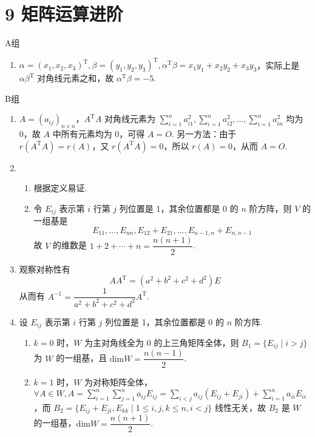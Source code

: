 \section*{9 矩阵运算进阶}

\vspace{2ex}

\centerline{\heiti A组}
\begin{enumerate}
    \item $\alpha = (x_1,x_2,x_3)^{\mathrm{T}},\beta = (y_1,y_2,y_3)^{\mathrm{T}},\alpha^{\mathrm{T}}\beta=x_1y_1+x_2y_2+x_3y_3$，实际上是 $\alpha\beta^{\mathrm{T}}$ 对角线元素之和，故 $\alpha^{\mathrm{T}}\beta=-5$.
\end{enumerate}

\centerline{\heiti B组}
\begin{enumerate}
    \item $A=(a_{ij})_{n\times n}$，$A^\mathrm{T}A$ 对角线元素为 $\displaystyle\sum_{i=1}^na_{i1}^2,\sum_{i=1}^na_{i2}^2,\ldots,\sum_{i=1}^na_{in}^2$ 均为 0，故 $A$ 中所有元素均为 0，可得 $A=O$. 另一方法：由于 $r(A^\mathrm{T}A) = r(A)$，又 $r(A^\mathrm{T}A)=0$，所以 $r(A)=0$，从而 $A=O$.

    \item \begin{enumerate}
              \item 根据定义易证.

              \item 令 $E_{ij}$ 表示第 $i$ 行第 $j$ 列位置是 1，其余位置都是 0 的 $n$ 阶方阵，则 $V$ 的一组基是
                    \[E_{11},\ldots,E_{nn},E_{12}+E_{21},\ldots,E_{n-1,n}+E_{n,n-1}\]
                    故 $V$ 的维数是 $1+2+\cdots+n=\dfrac{n(n+1)}{2}$.
          \end{enumerate}

    \item 观察对称性有
          \[AA^{\mathrm{T}}=(a^2+b^2+c^2+d^2)E\]
          从而有 $A^{-1}=\dfrac{1}{a^2+b^2+c^2+d^2}A^{\mathrm{T}}$.

    \item 设 $E_{ij}$ 表示第 $i$ 行第 $j$ 列位置是 1，其余位置都是 0 的 $n$ 阶方阵.
          \begin{enumerate}
              \item $k=0$ 时，$W$ 为主对角线全为 0 的上三角矩阵全体，则 $B_1=\{E_{ij} \mid i>j\}$ 为 $W$ 的一组基，且 $\mathrm{dim}W=\dfrac{n(n-1)}{2}$.

              \item $k=1$ 时，$W$ 为对称矩阵全体，$\forall A\in W,A = \displaystyle\sum_{i=1}^n\sum_{j=1}^na_{ij}E_{ij}=\sum_{i<j}a_{ij}(E_{ij}+E_{ji})+\sum_{i=1}^na_{ii}E_{ii}$，而 $B_2=\{E_{ij}+E_{ji},E_{kk} \mid 1\leqslant i,j,k\leqslant n,i<j\}$ 线性无关，故 $B_2$ 是 $W$ 的一组基，$\mathrm{dim}W=\dfrac{n(n+1)}{2}$.


\end{enumerate}
\end{enumerate}
